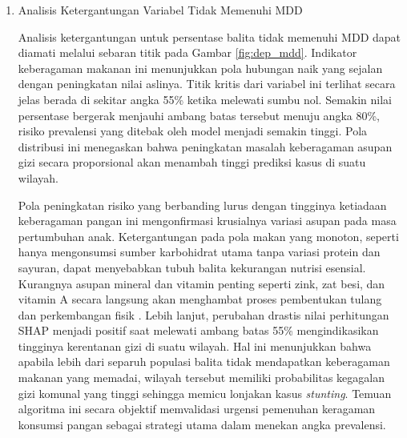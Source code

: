 \begin{enumerate}[listparindent=\parindent]
    \indent Peningkatan risiko yang terlihat saat melewati batas kritis ini sangat sejalan dengan kondisi fisik pada ibu hamil. Pada kehamilan di usia remaja, tubuh ibu yang sebenarnya masih dalam masa pertumbuhan terpaksa berebut gizi dengan janin yang dikandungnya \cite{Rahman2025}. Kondisi ini membuat penyaluran nutrisi ke janin menjadi terhambat, sehingga memperbesar kemungkinan bayi lahir dengan Berat Badan Lahir Rendah (BBLR). Sebaliknya, pada kehamilan di usia tua, penurunan fungsi organ tubuh ibu membuat penyaluran makanan ke kandungan menjadi tidak optimal, yang juga berisiko menghambat perkembangan janin \cite{Rahman2025}. Perubahan drastis nilai SHAP menjadi positif saat melewati batas 14\% membuktikan bahwa banyaknya bayi yang lahir dalam kondisi rentan ini akan langsung memperburuk angka \textit{stunting} di suatu wilayah. Temuan algoritma ini menegaskan pentingnya program edukasi dan perencanaan keluarga untuk menekan angka ibu hamil berisiko agar tetap berada di bawah ambang batas 14\%.

    \item Analisis Ketergantungan Variabel Tidak Memenuhi MDD
    
    Analisis ketergantungan untuk persentase balita tidak memenuhi MDD dapat diamati melalui sebaran titik pada Gambar \ref{fig:dep_mdd}. Indikator keberagaman makanan ini menunjukkan pola hubungan naik yang sejalan dengan peningkatan nilai aslinya. Titik kritis dari variabel ini terlihat secara jelas berada di sekitar angka 55\% ketika melewati sumbu nol. Semakin nilai persentase bergerak menjauhi ambang batas tersebut menuju angka 80\%, risiko prevalensi yang ditebak oleh model menjadi semakin tinggi. Pola distribusi ini menegaskan bahwa peningkatan masalah keberagaman asupan gizi secara proporsional akan menambah tinggi prediksi kasus di suatu wilayah.

    \indent Pola peningkatan risiko yang berbanding lurus dengan tingginya ketiadaan keberagaman pangan ini mengonfirmasi krusialnya variasi asupan pada masa pertumbuhan anak. Ketergantungan pada pola makan yang monoton, seperti hanya mengonsumsi sumber karbohidrat utama tanpa variasi protein dan sayuran, dapat menyebabkan tubuh balita kekurangan nutrisi esensial. Kurangnya asupan mineral dan vitamin penting seperti zink, zat besi, dan vitamin A secara langsung akan menghambat proses pembentukan tulang dan perkembangan fisik \cite{UNICEF2024_ChildFoodPoverty}. Lebih lanjut, perubahan drastis nilai perhitungan SHAP menjadi positif saat melewati ambang batas 55\% mengindikasikan tingginya kerentanan gizi di suatu wilayah. Hal ini menunjukkan bahwa apabila lebih dari separuh populasi balita tidak mendapatkan keberagaman makanan yang memadai, wilayah tersebut memiliki probabilitas kegagalan gizi komunal yang tinggi sehingga memicu lonjakan kasus \textit{stunting}. Temuan algoritma ini secara objektif memvalidasi urgensi pemenuhan keragaman konsumsi pangan sebagai strategi utama dalam menekan angka prevalensi.


\end{enumerate}

